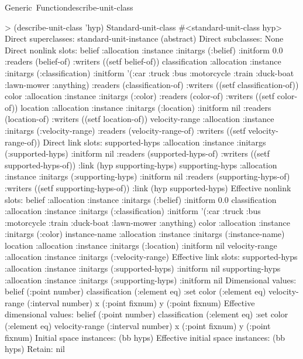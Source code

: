 \documentclass[10pt,twoside,english,pdftex]{article}
\begin{document}
\begin{functiondoc}{Generic~Function}{describe-unit-class}
\fnexample
%
\W\supp
\begin{example}
> (describe-unit-class 'hyp)
Standard-unit-class #<standard-unit-class hyp>
  Direct superclasses:
    standard-unit-instance (abstract)
  Direct subclasses: None\goodpagebreak
  Direct nonlink slots:
    belief
      :allocation :instance
      :initargs (:belief)
      :initform 0.0
      :readers (belief-of)
      :writers ((setf belief-of))\goodpagebreak
    classification
      :allocation :instance
      :initargs (:classification)
      :initform '(:car :truck :bus :motorcycle :train :duck-boat :lawn-mower
                  :anything)
      :readers (classification-of)
      :writers ((setf classification-of))\goodpagebreak
    color
      :allocation :instance
      :initargs (:color)
      :readers (color-of)
      :writers ((setf color-of))\goodpagebreak
    location
      :allocation :instance
      :initargs (:location)
      :initform nil
      :readers (location-of)
      :writers ((setf location-of))\goodpagebreak
    velocity-range
      :allocation :instance
      :initargs (:velocity-range)
      :readers (velocity-range-of)
      :writers ((setf velocity-range-of))\goodpagebreak
  Direct link slots:
    supported-hyps
      :allocation :instance
      :initargs (:supported-hyps)
      :initform nil
      :readers (supported-hyps-of)
      :writers ((setf supported-hyps-of))
      :link (hyp supporting-hyps)\goodpagebreak
    supporting-hyps
      :allocation :instance
      :initargs (:supporting-hyps)
      :initform nil
      :readers (supporting-hyps-of)
      :writers ((setf supporting-hyps-of))
      :link (hyp supported-hyps)\goodpagebreak
  Effective nonlink slots:
    belief
      :allocation :instance
      :initargs (:belief)
      :initform 0.0\goodpagebreak
    classification
      :allocation :instance
      :initargs (:classification)
      :initform '(:car :truck :bus :motorcycle :train :duck-boat :lawn-mower
                  :anything)\goodpagebreak
    color
      :allocation :instance
      :initargs (:color)\goodpagebreak
    instance-name
      :allocation :instance
      :initargs (:instance-name)\goodpagebreak
    location
      :allocation :instance
      :initargs (:location)
      :initform nil\goodpagebreak
    velocity-range
      :allocation :instance
      :initargs (:velocity-range)\goodpagebreak
  Effective link slots:
    supported-hyps
      :allocation :instance
      :initargs (:supported-hyps)
      :initform nil\goodpagebreak
    supporting-hyps
      :allocation :instance
      :initargs (:supporting-hyps)
      :initform nil\goodpagebreak
  Dimensional values:
    belief (:point number)
    classification (:element eq) :set
    color (:element eq)
    velocity-range (:interval number)
    x (:point fixnum)
    y (:point fixnum)\goodpagebreak
  Effective dimensional values:
    belief (:point number)
    classification (:element eq) :set
    color (:element eq)
    velocity-range (:interval number)
    x (:point fixnum)
    y (:point fixnum)\goodpagebreak
  Initial space instances:
    (bb hyps)
  Effective initial space instances:
    (bb hyps)
  Retain: nil
\end{example}


\end{functiondoc}
\end{document}
